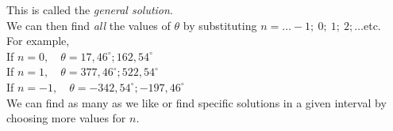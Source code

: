 \begin{wex}{}
{This is called the \emph{general solution}.\\

We can then find \emph{all} the values of $\theta$ by substituting $n=\ldots-1;~0;~1;~2;\ldots$etc.\\
For example,\\
If $n = 0,\quad \theta = 17,46^{\circ}; 162,54^{\circ}$ \\
If $n = 1,\quad \theta = 377,46^{\circ}; 522,54^{\circ}$ \\
If $n = -1,\quad \theta = -342,54^{\circ}; -197,46^{\circ}$ \\ 
We can find as many as we like or find specific solutions in a given interval by choosing more values for $n$.
}
\end{wex}

